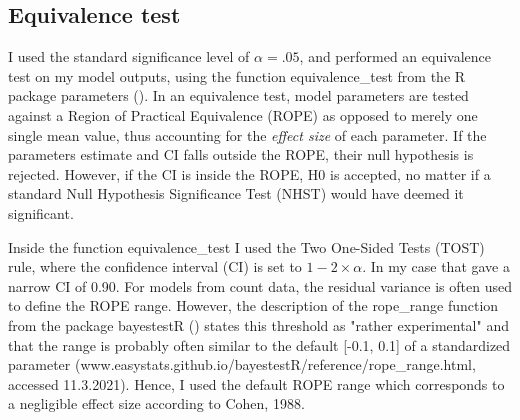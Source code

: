 \subsection*{Equivalence test}
I used the standard significance level of $\alpha = .05$, and performed an equivalence test on my model outputs, using the function equivalence\_test from the R package parameters ().%
In an equivalence test, model parameters are tested against a Region of Practical Equivalence (ROPE) as opposed to merely one single mean value, thus accounting for the \emph{effect size} of each parameter.
If the parameters estimate and CI falls outside the ROPE, their null hypothesis is rejected. However, if the CI is inside the ROPE, H0 is accepted, no matter if a standard Null Hypothesis Significance Test (NHST) would have deemed it significant.

Inside the function equivalence\_test I used the Two One-Sided Tests (TOST) rule, where the confidence interval (CI) is set to $1 - 2\times \alpha$. In my case that gave a narrow CI of 0.90.
For models from count data, the residual variance is often used to define the ROPE range. However, the description of the rope\_range function from the package bayestestR () states this threshold as "rather experimental" and that the range is probably often similar to the default [-0.1, 0.1] of a standardized parameter (www.easystats.github.io/bayestestR/reference/rope\_range.html, accessed 11.3.2021). %
Hence, I used the default ROPE range which corresponds to a negligible effect size according to Cohen, 1988.











